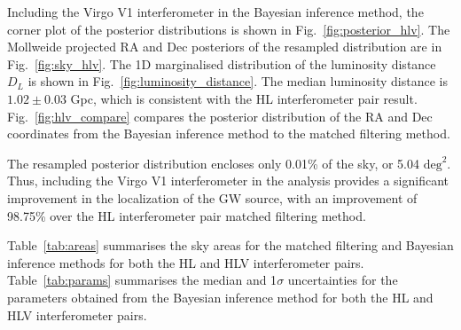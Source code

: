 \documentclass[11pt,a4paper]{article}
\begin{document}
\clearpage
Including the Virgo V1 interferometer in the Bayesian inference method, the corner plot of the posterior distributions is shown in Fig.~\ref{fig:posterior_hlv}. The Mollweide projected RA and Dec posteriors of the resampled distribution are in Fig.~\ref{fig:sky_hlv}. The 1D marginalised distribution of the luminosity distance $D_L$ is shown in Fig.~\ref{fig:luminosity_distance}. The median luminosity distance is $1.02 \pm 0.03$ Gpc, which is consistent with the HL interferometer pair result. Fig.~\ref{fig:hlv_compare} compares the posterior distribution of the RA and Dec coordinates from the Bayesian inference method to the matched filtering method. 

The resampled posterior distribution encloses only 0.01\% of the sky, or 5.04 $\mathrm{deg}^2$. Thus, including the Virgo V1 interferometer in the analysis provides a significant improvement in the localization of the GW source, with an improvement of 98.75\% over the HL interferometer pair matched filtering method.

Table~\ref{tab:areas} summarises the sky areas for the matched filtering and Bayesian inference methods for both the HL and HLV interferometer pairs. Table~\ref{tab:params} summarises the median and 1$\sigma$ uncertainties for the parameters obtained from the Bayesian inference method for both the HL and HLV interferometer pairs.
\end{document}
